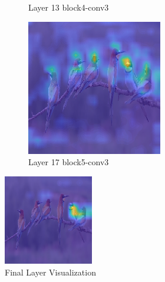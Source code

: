 \begin{figure}
\begin{subfigure}[b]{0.30\textwidth}
         \caption{Layer 13 block4-conv3}
         \label{fig:layer-13}
     \end{subfigure}
     \begin{subfigure}[b]{0.30\textwidth}
         \centering
         \includegraphics[width=\textwidth]{images/hm-layer-13.png}
         \caption{Layer 17 block5-conv3}
         \label{fig:layer-17}
     \end{subfigure}
    
    \label{fig:three graphs}
    
    \vspace{1em}%
    \includegraphics[width=0.35\textwidth]{images/hm-layer-17.png}
    \vspace{1em}%
    \caption{Final Layer Visualization}
    \label{fig:DeepViz - Visual Explanation Tool}

\end{figure}

